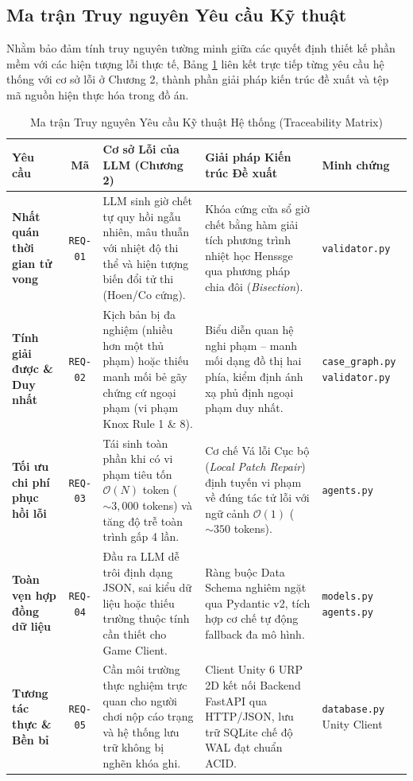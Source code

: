 \subsection{Ma trận Truy nguyên Yêu cầu Kỹ thuật}
Nhằm bảo đảm tính truy nguyên tường minh giữa các quyết định thiết kế phần mềm với các hiện tượng lỗi thực tế, Bảng \ref{tab:traceability_matrix} liên kết trực tiếp từng yêu cầu hệ thống với cơ sở lỗi ở Chương 2, thành phần giải pháp kiến trúc đề xuất và tệp mã nguồn hiện thực hóa trong đồ án.

\begin{table}[H]
\centering
\small
\setlength{\tabcolsep}{4pt}
\caption{Ma trận Truy nguyên Yêu cầu Kỹ thuật Hệ thống (Traceability Matrix)}
\label{tab:traceability_matrix}
\begin{tabularx}{\textwidth}{p{2.0cm} c p{4.2cm} p{4.2cm} p{2.4cm}}
\toprule
\textbf{Yêu cầu} & \textbf{Mã} & \textbf{Cơ sở Lỗi của LLM (Chương 2)} & \textbf{Giải pháp Kiến trúc Đề xuất} & \textbf{Minh chứng} \\
\midrule
\textbf{Nhất quán thời gian tử vong} & \texttt{REQ-01} & LLM sinh giờ chết tự quy hồi ngẫu nhiên, mâu thuẫn với nhiệt độ thi thể và hiện tượng biến đổi tử thi (Hoen/Co cứng). & Khóa cứng cửa sổ giờ chết bằng hàm giải tích phương trình nhiệt học Henssge qua phương pháp chia đôi (\textit{Bisection}). & \texttt{validator.py} \\
\textbf{Tính giải được \& Duy nhất} & \texttt{REQ-02} & Kịch bản bị đa nghiệm (nhiều hơn một thủ phạm) hoặc thiếu manh mối bẻ gãy chứng cứ ngoại phạm (vi phạm Knox Rule 1 \& 8). & Biểu diễn quan hệ nghi phạm -- manh mối dạng đồ thị hai phía, kiểm định ánh xạ phủ định ngoại phạm duy nhất. & \texttt{case\_graph.py} \newline \texttt{validator.py} \\
\textbf{Tối ưu chi phí phục hồi lỗi} & \texttt{REQ-03} & Tái sinh toàn phần khi có vi phạm tiêu tốn $\mathcal{O}(N)$ token ($\sim 3,000$ tokens) và tăng độ trễ toàn trình gấp 4 lần. & Cơ chế Vá lỗi Cục bộ (\textit{Local Patch Repair}) định tuyến vi phạm về đúng tác tử lỗi với ngữ cảnh $\mathcal{O}(1)$ ($\sim 350$ tokens). & \texttt{agents.py} \\
\textbf{Toàn vẹn hợp đồng dữ liệu} & \texttt{REQ-04} & Đầu ra LLM dễ trôi định dạng JSON, sai kiểu dữ liệu hoặc thiếu trường thuộc tính cần thiết cho Game Client. & Ràng buộc Data Schema nghiêm ngặt qua Pydantic v2, tích hợp cơ chế tự động fallback đa mô hình. & \texttt{models.py} \newline \texttt{agents.py} \\
\textbf{Tương tác thực \& Bền bỉ} & \texttt{REQ-05} & Cần môi trường thực nghiệm trực quan cho người chơi nộp cáo trạng và hệ thống lưu trữ không bị nghẽn khóa ghi. & Client Unity 6 URP 2D kết nối Backend FastAPI qua HTTP/JSON, lưu trữ SQLite chế độ WAL đạt chuẩn ACID. & \texttt{database.py} \newline Unity Client \\
\bottomrule
\end{tabularx}
\end{table}

